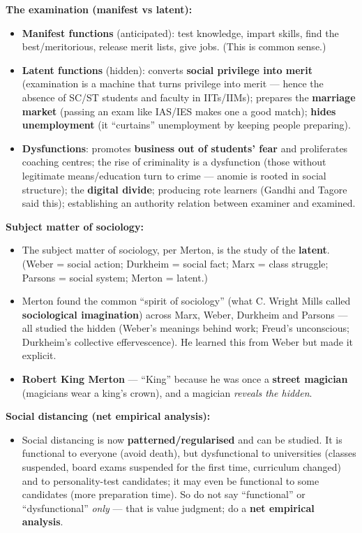 \begin{ExampleBox}
\textbf{The examination (manifest vs latent):}
\begin{itemize}
\item \textbf{Manifest functions} (anticipated): test knowledge, impart skills, find the best/meritorious, release merit lists, give jobs. (This is common sense.)
\item \textbf{Latent functions} (hidden): converts \textbf{social privilege into merit} (examination is a machine that turns privilege into merit --- hence the absence of SC/ST students and faculty in IITs/IIMs); prepares the \textbf{marriage market} (passing an exam like IAS/IES makes one a good match); \textbf{hides unemployment} (it ``curtains'' unemployment by keeping people preparing).
\item \textbf{Dysfunctions}: promotes \textbf{business out of students' fear} and proliferates coaching centres; the rise of criminality is a dysfunction (those without legitimate means/education turn to crime --- anomie is rooted in social structure); the \textbf{digital divide}; producing rote learners (Gandhi and Tagore said this); establishing an authority relation between examiner and examined.
\end{itemize}
\end{ExampleBox}

\begin{CriticalPoint}
\textbf{Subject matter of sociology:}
\begin{itemize}
\item The subject matter of sociology, per Merton, is the study of the \textbf{latent}. (Weber = social action; Durkheim = social fact; Marx = class struggle; Parsons = social system; Merton = latent.)
\item Merton found the common ``spirit of sociology'' (what C. Wright Mills called \textbf{sociological imagination}) across Marx, Weber, Durkheim and Parsons --- all studied the hidden (Weber's meanings behind work; Freud's unconscious; Durkheim's collective effervescence). He learned this from Weber but made it explicit.
\item \textbf{Robert King Merton} --- ``King'' because he was once a \textbf{street magician} (magicians wear a king's crown), and a magician \textit{reveals the hidden}.
\end{itemize}
\end{CriticalPoint}

\begin{ExampleBox}
\textbf{Social distancing (net empirical analysis):}
\begin{itemize}
\item Social distancing is now \textbf{patterned/regularised} and can be studied. It is functional to everyone (avoid death), but dysfunctional to universities (classes suspended, board exams suspended for the first time, curriculum changed) and to personality-test candidates; it may even be functional to some candidates (more preparation time). So do not say ``functional'' or ``dysfunctional'' \textit{only} --- that is value judgment; do a \textbf{net empirical analysis}.
\end{itemize}
\end{ExampleBox}

